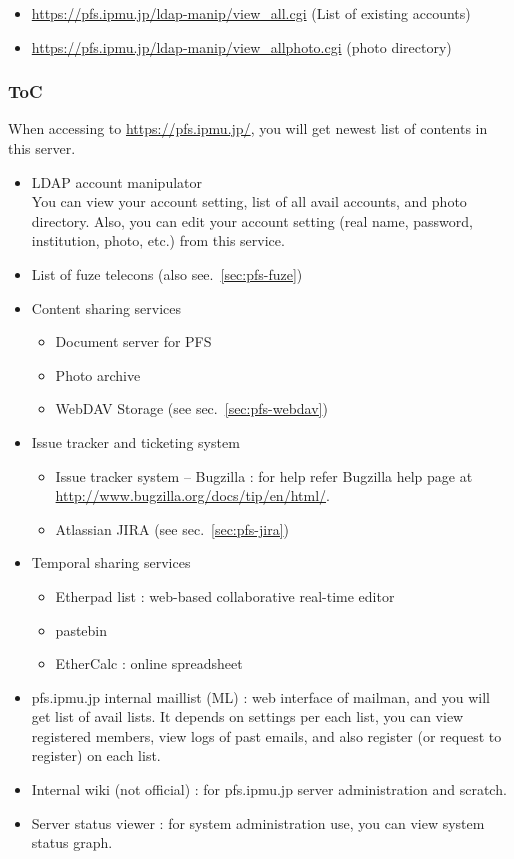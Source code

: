 \documentclass[a4paper,notitlepage]{article}
\begin{document}
\begin{itemize}
  \item \url{https://pfs.ipmu.jp/ldap-manip/view_all.cgi} (List of existing accounts)
  \item \url{https://pfs.ipmu.jp/ldap-manip/view_allphoto.cgi} (photo directory)
\end{itemize}

\subsubsection{ToC}

When accessing to \url{https://pfs.ipmu.jp/}, you will get newest list of 
contents in this server. 

\begin{itemize}
  \item LDAP account manipulator \\
    You can view your account setting, list of all avail accounts, and photo 
    directory. 
    Also, you can edit your account setting (real name, password, institution, 
    photo, etc.) from this service.
  \item List of fuze telecons (also see.~\ref{sec:pfs-fuze})
  \item Content sharing services
    \begin{itemize}
      \item Document server for PFS
      \item Photo archive
      \item WebDAV Storage (see sec.~\ref{sec:pfs-webdav})
    \end{itemize}
  \item Issue tracker and ticketing system
    \begin{itemize}
      \item Issue tracker system -- Bugzilla : 
        for help refer Bugzilla help page at 
        \url{http://www.bugzilla.org/docs/tip/en/html/}.
      \item Atlassian JIRA (see sec.~\ref{sec:pfs-jira})
    \end{itemize}
  \item Temporal sharing services
    \begin{itemize}
      \item Etherpad list : web-based collaborative real-time editor
      \item pastebin
      \item EtherCalc : online spreadsheet
    \end{itemize}
  \item pfs.ipmu.jp internal maillist (ML) :
    web interface of mailman, and you will get list of avail lists. 
    It depends on settings per each list, you can view registered members, 
    view logs of past emails, and also register (or request to register) on 
    each list. 
  \item Internal wiki (not official) : 
    for pfs.ipmu.jp server administration and scratch. 
  \item Server status viewer : 
    for system administration use, you can view system status graph.
\end{itemize}
\end{document}
